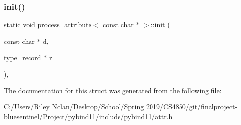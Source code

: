 \subsubsection{\texorpdfstring{init()}{init()}\hspace{0.1cm}{\footnotesize\ttfamily [2/2]}}
{\footnotesize\ttfamily static \mbox{\hyperlink{_s_d_l__opengles2__gl2ext_8h_ae5d8fa23ad07c48bb609509eae494c95}{void}} \mbox{\hyperlink{structprocess__attribute}{process\+\_\+attribute}}$<$ const char $\ast$ $>$\+::init (\begin{DoxyParamCaption}\item[{const char $\ast$}]{d,  }\item[{\mbox{\hyperlink{structtype__record}{type\+\_\+record}} $\ast$}]{r }\end{DoxyParamCaption})\hspace{0.3cm}{\ttfamily [inline]}, {\ttfamily [static]}}



The documentation for this struct was generated from the following file\+:\begin{DoxyCompactItemize}
\item 
C\+:/\+Users/\+Riley Nolan/\+Desktop/\+School/\+Spring 2019/\+C\+S4850/git/finalproject-\/bluesentinel/\+Project/pybind11/include/pybind11/\mbox{\hyperlink{attr_8h}{attr.\+h}}\end{DoxyCompactItemize}
